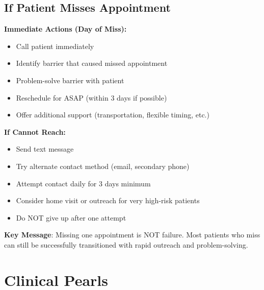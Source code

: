 \documentclass[11pt]{article}
\begin{document}
\subsection{If Patient Misses Appointment}

\begin{tcolorbox}[colback=red!10!white,colframe=red!75!black,title=\textbf{SAME-DAY RESPONSE REQUIRED},breakable]
\textbf{Immediate Actions (Day of Miss):}
\begin{itemize}[leftmargin=*]
\item Call patient immediately
\item Identify barrier that caused missed appointment
\item Problem-solve barrier with patient
\item Reschedule for ASAP (within 3 days if possible)
\item Offer additional support (transportation, flexible timing, etc.)
\end{itemize}

\textbf{If Cannot Reach:}
\begin{itemize}[leftmargin=*]
\item Send text message
\item Try alternate contact method (email, secondary phone)
\item Attempt contact daily for 3 days minimum
\item Consider home visit or outreach for very high-risk patients
\item Do NOT give up after one attempt
\end{itemize}

\textbf{Key Message}: Missing one appointment is NOT failure. Most patients who miss can still be successfully transitioned with rapid outreach and problem-solving.
\end{tcolorbox}

\section{Clinical Pearls}
\end{document}
